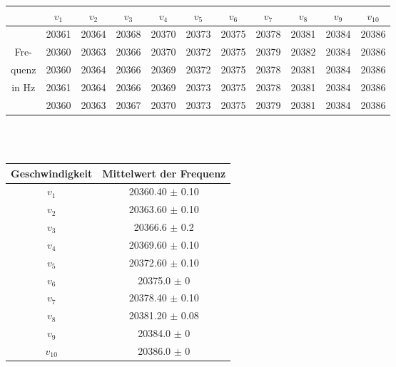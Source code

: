 \begin{center}
\begin{tabular}{c||c|c|c|c|c|c|c|c|c|c}
	& $v_1$ & $v_2$ & $v_3$ & $v_4$ & $v_5$ & $v_6$ & $v_7$ & $v_8$ & $v_9$ & $v_{10}$ \\
	\hline
	& 20361 & 20364 & 20368 & 20370 & 20373 & 20375 & 20378 & 20381 & 20384 & 20386 \\
	Fre- & 20360 & 20363 & 20366 & 20370 & 20372 & 20375 & 20379 & 20382 & 20384 & 20386 \\
	quenz & 20360 & 20364 & 20366 & 20369 & 20372 & 20375 & 20378 & 20381 & 20384 & 20386 \\
	in Hz & 20361 & 20364 & 20366 & 20369 & 20373 & 20375 & 20378 & 20381 & 20384 & 20386 \\
	& 20360 & 20363 & 20367 & 20370 & 20373 & 20375 & 20379 & 20381 & 20384 & 20386 \\
\end{tabular}
\ \\
\ \\
\begin{tabular}{c|c}
	Geschwindigkeit & Mittelwert der Frequenz \\
	\hline
	$v_1$ & 20360.40 $\pm$ 0.10 \\
	$v_2$ & 20363.60 $\pm$ 0.10 \\
	$v_3$ & 20366.6 $\pm$ 0.2 \\
	$v_4$ & 20369.60 $\pm$ 0.10 \\
	$v_5$ & 20372.60 $\pm$ 0.10 \\
	$v_6$ & 20375.0 $\pm$ 0 \\
	$v_7$ & 20378.40 $\pm$ 0.10 \\
	$v_8$ & 20381.20 $\pm$ 0.08 \\
	$v_9$ & 20384.0 $\pm$ 0 \\
	$v_{10}$ & 20386.0 $\pm$ 0 \\
\end{tabular}


\end{center}